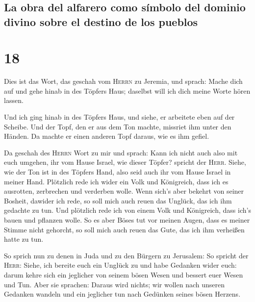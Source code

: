 \hypertarget{la-obra-del-alfarero-como-suxedmbolo-del-dominio-divino-sobre-el-destino-de-los-pueblos}{%
\subsection{La obra del alfarero como símbolo del dominio divino sobre
el destino de los
pueblos}\label{la-obra-del-alfarero-como-suxedmbolo-del-dominio-divino-sobre-el-destino-de-los-pueblos}}

\hypertarget{section-17}{%
\section{18}\label{section-17}}

 Dies ist das Wort, das geschah vom \textsc{Herrn} zu
Jeremia, und sprach:  Mache dich auf und gehe hinab in des
Töpfers Haus; daselbst will ich dich meine Worte hören lassen.

 Und ich ging hinab in des Töpfers Haus, und siehe, er
arbeitete eben auf der Scheibe.  Und der Topf, den er aus
dem Ton machte, missriet ihm unter den Händen. Da machte er einen
anderen Topf daraus, wie es ihm gefiel.

 Da geschah des \textsc{Herrn} Wort zu mir und sprach:
 Kann ich nicht auch also mit euch umgehen, ihr vom Hause
Israel, wie dieser Töpfer? spricht der \textsc{Herr}. Siehe, wie der Ton
ist in des Töpfers Hand, also seid auch ihr vom Hause Israel in meiner
Hand.  Plötzlich rede ich wider ein Volk und Königreich,
dass ich es ausrotten, zerbrechen und verderben wolle. 
Wenn sich's aber bekehrt von seiner Bosheit, dawider ich rede, so soll
mich auch reuen das Unglück, das ich ihm gedachte zu tun. 
Und plötzlich rede ich von einem Volk und Königreich, dass ich's bauen
und pflanzen wolle.  So es aber Böses tut vor meinen
Augen, dass es meiner Stimme nicht gehorcht, so soll mich auch reuen das
Gute, das ich ihm verheißen hatte zu tun.

 So sprich nun zu denen in Juda und zu den Bürgern zu
Jerusalem: So spricht der \textsc{Herr}: Siehe, ich bereite euch ein
Unglück zu und habe Gedanken wider euch: darum kehre sich ein jeglicher
von seinem bösen Wesen und bessert euer Wesen und Tun. 
Aber sie sprachen: Daraus wird nichts; wir wollen nach unseren Gedanken
wandeln und ein jeglicher tun nach Gedünken seines bösen Herzens.

